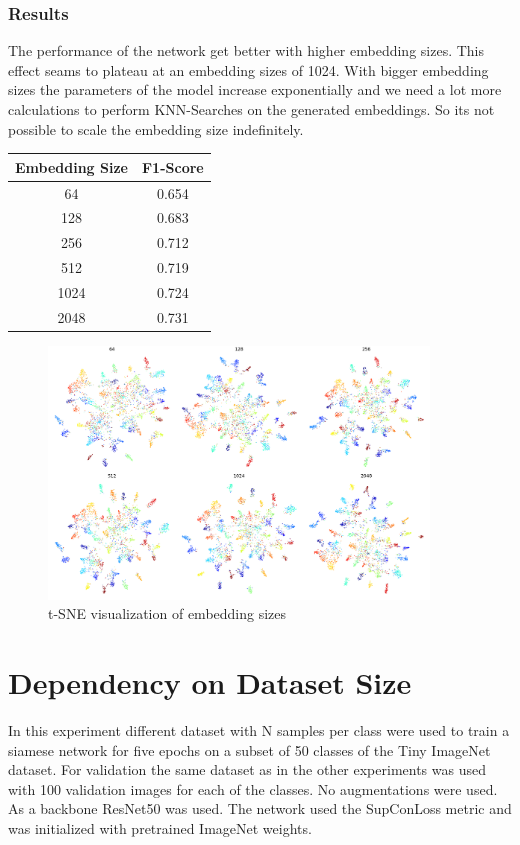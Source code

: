 \documentclass[12pt,a4paper]{report}
\newcommand{\splitlayout}[2]{
	\begin{minipage}{0.6\textwidth}
		#1
	\end{minipage}
	\hfill
	\begin{minipage}{0.35\textwidth}
		#2
	\end{minipage}	
}
\begin{document}
\subsubsection{Results}
\splitlayout{
	The performance of the network get better with higher embedding sizes.
	This effect seams to plateau at an embedding sizes of 1024.
	With bigger embedding sizes the parameters of the model increase exponentially and we need a lot more calculations to perform KNN-Searches on the generated embeddings.
	So its not possible to scale the embedding size indefinitely.
}{
	\begin{tabular}{ | c | c | }
		\hline
		Embedding Size &  F1-Score \\ 
		\hline
		64 &  0.654 \\ 
		\hline
		128 & 0.683 \\ 
		\hline
		256 & 0.712 \\ 
		\hline
		512 & 0.719 \\ 
		\hline
		1024 & 0.724  \\ 
		\hline
		2048 & 0.731 \\ 
		\hline
	\end{tabular}
}

\begin{figure}[hb]
	\centering
	\includegraphics[width=0.9\textwidth]{../plots/embedding_size.png}
	\caption{t-SNE visualization of embedding sizes}
\end{figure}


\newpage


\section{Dependency on Dataset Size}

In this experiment different dataset with N samples per class were used to train a siamese network for five epochs on a subset of 50 classes of the Tiny ImageNet dataset.
For validation the same dataset as in the other experiments was used with 100 validation images for each of the classes.
No augmentations were used.
As a backbone ResNet50 was used.
The network used the SupConLoss metric and was initialized with pretrained ImageNet weights.
\end{document}
